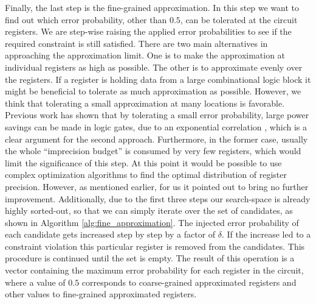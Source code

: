 \documentclass[conference]{IEEEtran}
\begin{document}
Finally, the last step is the fine-grained approximation. In this step we want to find out which error probability, other than $0.5$, can be tolerated at the circuit registers. We are step-wise raising the applied error probabilities to see if the required constraint is still satisfied. There are two main alternatives in approaching the approximation limit. One is to make the approximation at individual registers as high as possible. The other is to approximate evenly over the registers. If a register is holding data from a large combinational logic block it might be beneficial to tolerate as much approximation as possible. However, we think that tolerating a small approximation at many locations is favorable. Previous work has shown that by tolerating a small error probability, large power savings can be made in logic gates, due to an exponential correlation \cite{korkmaz2006advocating}, which is a clear argument for the second approach. Furthermore, in the former case, usually the whole ``imprecision budget'' is consumed by very few registers, which would limit the significance of this step. At this point it would be possible to use complex optimization algorithms to find the optimal distribution of register precision. However, as mentioned earlier, for us it pointed out to bring no further improvement. Additionally, due to the first three steps our search-space is already highly sorted-out, so that we can simply iterate over the set of candidates, as shown in Algorithm \ref{alg:fine_approximation}. The injected error probability of each candidate gets increased step by step by a factor of $\delta$. If the increase led to a constraint violation this particular register is removed from the candidates. This procedure is continued until the set is empty. The result of this operation is a vector containing the maximum error probability for each register in the circuit, where a value of $0.5$ corresponds to coarse-grained approximated registers and other values to fine-grained approximated registers.
\end{document}

